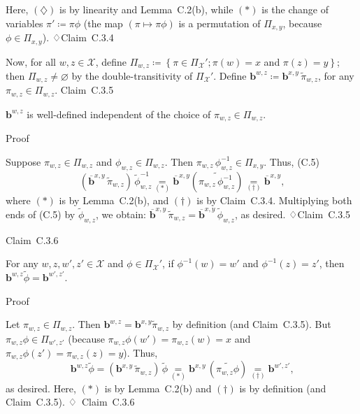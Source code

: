 \documentclass[
]{article}
\begin{document}
Here, \((\diamondsuit)\) is by linearity and Lemma~C.2(b), while
\(( \ast )\) is the change of variables \(\pi' ≔ \pi\phi\) (the map
\(\left( \pi\mapsto\pi\phi \right)\) is a permutation of \(\Pi_{x,y}\),
because \(\phi \in \Pi_{x,y}\)). ♢Claim~C.3.4

Now, for all \(w,z \in \mathcal{X}\), define
\(\Pi_{w,z} ≔ \left\{ \pi \in \Pi_{\mathcal{X}}';\pi(w) = x \right.\)
and \(\left. \pi(z) = y \right\}\); then
\(\Pi_{w,z} \neq \varnothing\) by the double-transitivity of
\(\Pi_{\mathcal{X}}'\). Define
\(\mathbf{b}^{w,z} ≔ \mathbf{b}^{x,y}\,{\widetilde{\pi}}_{w,z}\), for
any \(\pi_{w,z} \in \Pi_{w,z}\). Claim~C.3.5

\(\mathbf{b}^{w,z}\) is well-defined independent of the choice of
\(\pi_{w,z} \in \Pi_{w,z}\).

Proof

Suppose \(\pi_{w,z} \in \Pi_{w,z}\) and \(\phi_{w,z} \in \Pi_{w,z}\).
Then \(\pi_{w,z}\,\phi_{w,z}^{- 1} \in \Pi_{x,y}\). Thus,
(C.5)\[\left( {\overline{\mathbf{b}}}^{x,y}\,{\widetilde{\pi}}_{w,z} \right)\,{\widetilde{\phi}}_{w,z}^{- 1}\underset{( \ast )}{=}{\overline{\mathbf{b}}}^{x,y}\left( \widetilde{\pi_{w,z}\,\phi_{w,z}^{-1}} \right)\underset{( \dagger )}{=}{\overline{\mathbf{b}}}^{x,y}\text{,}\]
where \(( \ast )\) is by Lemma~C.2(b), and \(( \dagger )\) is by
Claim~C.3.4. Multiplying both ends of (C.5) by
\({\widetilde{\phi}}_{w,z}\), we obtain:
\({\overline{\mathbf{b}}}^{x,y}\,{\widetilde{\pi}}_{w,z} = {\overline{\mathbf{b}}}^{x,y}\,{\widetilde{\phi}}_{w,z}\),
as desired. ♢Claim~C.3.5

Claim~C.3.6

For any \(w,z,w',z' \in \mathcal{X}\) and
\(\phi \in \Pi_{\mathcal{X}}'\), if \(\phi^{- 1}(w) = w'\) and
\(\phi^{- 1}(z) = z'\), then
\(\mathbf{b}^{w,z}\widetilde{\phi} = \mathbf{b}^{w',z'}\).

Proof

Let \(\pi_{w,z} \in \Pi_{w,z}\). Then
\(\mathbf{b}^{w,z} = \mathbf{b}^{x,y}{\widetilde{\pi}}_{w,z}\) by
definition (and Claim~C.3.5). But \(\pi_{w,z}\phi \in \Pi_{w',z'}\)
(because \(\pi_{w,z}\phi\left( w' \right) = \pi_{w,z}(w) = x\) and
\(\pi_{w,z}\phi\left( z' \right) = \pi_{w,z}(z) = y\)). Thus,
\[\mathbf{b}^{w,z}\widetilde{\phi} = \left( \mathbf{b}^{x,y}\,{\widetilde{\pi}}_{w,z} \right)\,\widetilde{\phi}\underset{( \ast )}{=}\mathbf{b}^{x,y}\,\left( \widetilde{\pi_{w,z}\phi} \right)\underset{( \dagger )}{=}\mathbf{b}^{w',z'}\text{,}\]
as desired. Here, \(( \ast )\) is by Lemma~C.2(b) and \(( \dagger )\) is
by definition (and Claim~C.3.5). ♢~Claim~C.3.6
\end{document}
